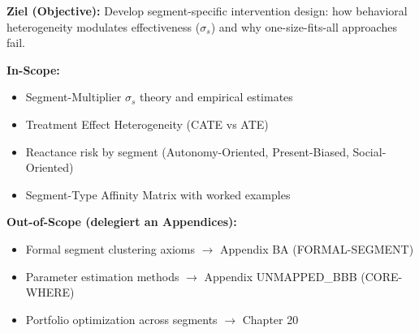 \begin{tcolorbox}[
    colback=purple!5!white,
    colframe=purple!75!black,
    title={\textbf{Chapter Scope: Ziel / In-Scope / Out-of-Scope}},
    fonttitle=\bfseries
]

\textbf{Ziel (Objective):}
Develop segment-specific intervention design: how behavioral heterogeneity modulates effectiveness ($\sigma_s$) and why one-size-fits-all approaches fail.

\vspace{0.3cm}
\textbf{In-Scope:}
\begin{itemize}[nosep]
    \item Segment-Multiplier $\sigma_s$ theory and empirical estimates
    \item Treatment Effect Heterogeneity (CATE vs ATE)
    \item Reactance risk by segment (Autonomy-Oriented, Present-Biased, Social-Oriented)
    \item Segment-Type Affinity Matrix with worked examples
\end{itemize}

\vspace{0.3cm}
\textbf{Out-of-Scope (delegiert an Appendices):}
\begin{itemize}[nosep]
    \item Formal segment clustering axioms $\rightarrow$ Appendix BA (FORMAL-SEGMENT)
    \item Parameter estimation methods $\rightarrow$ Appendix UNMAPPED_BBB (CORE-WHERE)
    \item Portfolio optimization across segments $\rightarrow$ Chapter 20
\end{itemize}

\end{tcolorbox}

